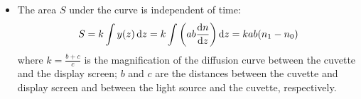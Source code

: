 \documentclass[11pt, a4paper]{article}
\newcommand{\diff}{\mathop{}\!\mathrm{d}} %
\begin{document}
\begin{itemize}
	\item The area $ S $ under the curve is independent of time:
	\begin{equation*}
		S = k\int y(z) \diff z = k\int \left(ab \dv{n}{z}\right)\diff z = k ab (n_{1}- n_{0})
	\end{equation*}
	where $ k = \frac{b+c}{c} $ is the magnification of the diffusion curve between the cuvette and the display screen; $ b $ and $ c $ are the distances between the cuvette and display screen and between the light source and the cuvette, respectively. 


\end{itemize}
\end{document}
